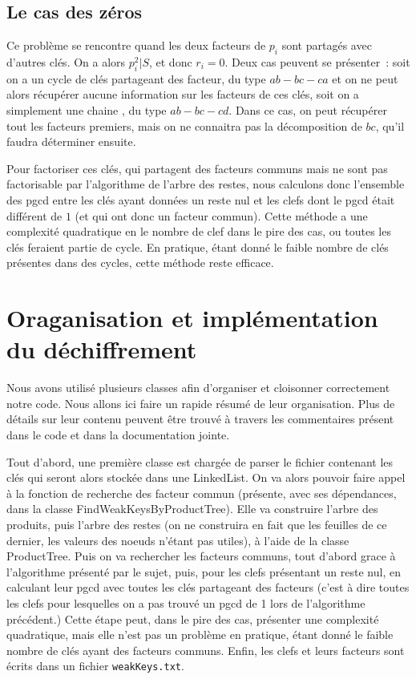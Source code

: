 \documentclass[a4paper,10pt]{article}
\begin{document}
   \subsection{Le \og{}cas des zéros\fg}
  
   Ce problème se rencontre quand les deux facteurs de $p_i$ sont partagés avec d'autres clés. On a alors $p_i^2 | S$, et donc $r_i = 0$. Deux cas peuvent se présenter~: soit on a un \og{} cycle \fg{} de clés partageant des facteur, du type $ab - bc - ca$ et on ne peut alors récupérer aucune information sur les facteurs de ces clés, soit on a simplement une \og{} chaine \fg, du type $ab - bc - cd$. Dans ce cas, on peut récupérer tout les facteurs premiers, mais on ne connaitra pas la décomposition de $bc$, qu'il faudra déterminer ensuite.
  
  Pour factoriser ces clés, qui partagent des facteurs communs mais ne sont pas factorisable par l'algorithme de l'arbre des restes, nous calculons donc l'ensemble des pgcd entre les clés ayant données un reste nul et les clefs dont le pgcd était différent de $1$ (et qui ont donc un facteur commun). Cette méthode a une complexité quadratique en le nombre de clef dans le pire des cas, ou toutes les clés feraient partie de cycle. En pratique, étant donné le faible nombre de clés présentes dans des cycles, cette méthode reste efficace.
  
  \section{Oraganisation et implémentation du déchiffrement}
  Nous avons utilisé plusieurs classes afin d'organiser et cloisonner correctement notre code. Nous allons ici faire un rapide résumé de leur organisation. Plus de détails sur leur contenu peuvent être trouvé à travers les commentaires présent dans le code et dans la documentation jointe.
  
  Tout d'abord, une première classe est chargée de parser le fichier contenant les clés qui seront alors stockée dans une LinkedList.
  On va alors pouvoir faire appel à la fonction de recherche des facteur commun (présente, avec ses dépendances, dans la classe FindWeakKeysByProductTree). Elle va construire l'arbre des produits, puis l'arbre des restes (on ne construira en fait que les feuilles de ce dernier, les valeurs des noeuds n'étant pas utiles), à l'aide de la classe ProductTree. Puis on va rechercher les facteurs communs, tout d'abord grace à l'algorithme présenté par le sujet, puis, pour les clefs présentant un reste nul, en calculant leur pgcd avec toutes les clés partageant des facteurs (c'est à dire toutes les clefs pour lesquelles on a pas trouvé un pgcd de 1 lors de l'algorithme précédent.)
  Cette étape peut, dans le pire des cas, présenter une complexité quadratique, mais elle n'est pas un problème en pratique, étant donné le faible nombre de clés ayant des facteurs communs.
  Enfin, les clefs et leurs facteurs sont écrits dans un fichier \texttt{weakKeys.txt}.
  
\end{document}
